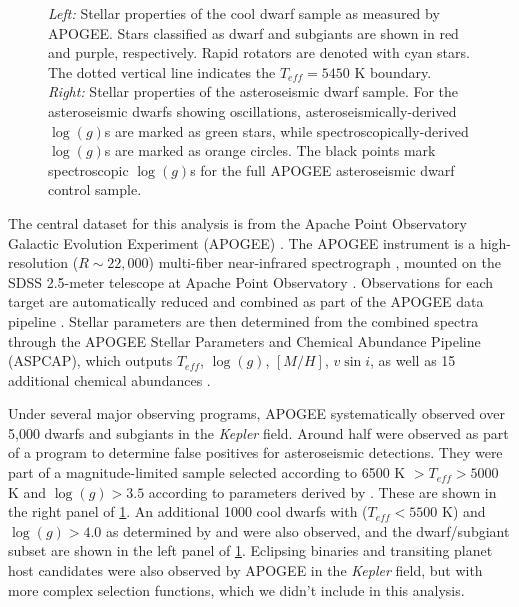 \documentclass[manuscript]{aastex6}
\newcommand{\vsini}{\ensuremath{v \sin i}}
\newcommand{\Kepler}{\mbox{\textit{Kepler}}}
\newcommand{\Teff}{\ensuremath{T_{eff}}}
\newcommand{\logg}{\ensuremath{\log(g)}}
\begin{document}
\begin{figure}
    \caption{\emph{Left:} Stellar properties of the cool dwarf sample as
        measured by APOGEE\@. Stars classified as dwarf and subgiants are 
        shown in red and purple, respectively. Rapid rotators are denoted with 
        cyan stars. The dotted vertical line indicates the \(\Teff = 5450\) K
        boundary.
        \emph{Right:} Stellar properties of the asteroseismic dwarf sample. 
        For the asteroseismic dwarfs showing oscillations, 
        asteroseismically-derived \logg{}s are marked as green stars, while 
        spectroscopically-derived \logg{}s are marked as orange circles. The 
        black points mark spectroscopic \logg{}s for the full APOGEE
        asteroseismic dwarf control sample. \label{fig:sample}}
\end{figure}


The central dataset for this analysis is from the Apache Point Observatory 
Galactic Evolution Experiment (APOGEE) \citep{Blanton17,Majewski17}. The
APOGEE instrument is a high-resolution (\(R \sim 22,000\)) multi-fiber 
near-infrared spectrograph \citep{Wilson10}, mounted on the SDSS 2.5-meter 
telescope at Apache Point Observatory \citep{Gunn06}. Observations for each
target are automatically reduced and combined as part of the APOGEE data 
pipeline \citep{Nidever15}. Stellar parameters are then determined from the 
combined spectra through the APOGEE Stellar Parameters and Chemical Abundance 
Pipeline (ASPCAP), which outputs \Teff{}, \logg{}, \([M/H]\), \vsini{}, as 
well as 15 additional chemical abundances \citep{GarciaPerez16}.

Under several major observing programs, APOGEE systematically observed over 
5,000 dwarfs and subgiants in the \Kepler{} field. Around half were
observed as part of a program to determine false positives for
asteroseismic detections. They were part of a magnitude-limited sample
selected according to 6500 K \(> \Teff > 5000\) K and \(\logg > 3.5\)
according to parameters derived by \citet{Huber14} \citep{Zasowski17}. These
are shown in the right panel of \cref{fig:sample}. An additional 1000 cool 
dwarfs with (\(\Teff < 5500\) K) and \(\logg > 4.0\) as determined
by \citet{Pinsonneault12} and \citet{Brown11} were also observed, and the
dwarf/subgiant subset are shown in the left panel of \cref{fig:sample}. 
Eclipsing binaries and transiting planet host candidates were also observed 
by APOGEE in the \Kepler{} field, but with more complex selection functions, 
which we didn't include in this analysis.
\end{document}
